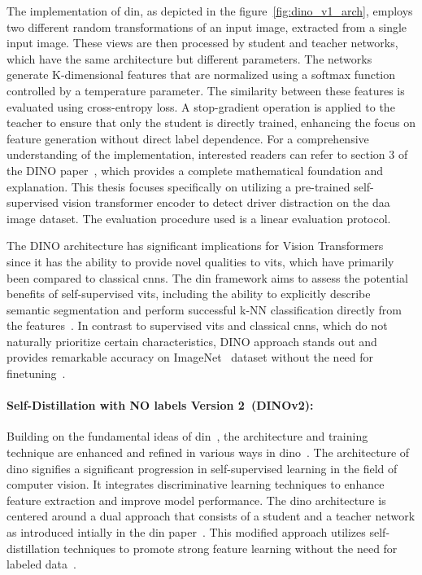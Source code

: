 The implementation of \gls{din}, as depicted in the figure~\ref{fig:dino_v1_arch}, employs two different random transformations of an input image, extracted from a single input image. These views are then processed by student and teacher networks, which have the same architecture but different parameters. The networks generate K-dimensional features that are normalized using a softmax function controlled by a temperature parameter. The similarity between these features is evaluated using cross-entropy loss. A stop-gradient operation is applied to the teacher to ensure that only the student is directly trained, enhancing the focus on feature generation without direct label dependence. For a comprehensive understanding of the implementation, interested readers can refer to section 3 of the DINO paper~\citep{dino_caron2021emerging}, which provides a complete mathematical foundation and explanation. This thesis focuses specifically on utilizing a pre-trained self-supervised vision transformer encoder to detect driver distraction on the \gls{daa} image dataset. The evaluation procedure used is a linear evaluation protocol.

The DINO architecture has significant implications for Vision Transformers~\citep{Vit_Paper_Dosovitskiy2020AnII} since it has the ability to provide novel qualities to \gls{vit}s, which have primarily been compared to classical \gls{cnn}s. The \gls{din} framework aims to assess the potential benefits of self-supervised \gls{vit}s, including the ability to explicitly describe semantic segmentation and perform successful k-NN classification directly from the features~\cite{dino_caron2021emerging}. In contrast to supervised \gls{vit}s and classical \gls{cnn}s, which do not naturally prioritize certain characteristics, DINO approach stands out and provides remarkable accuracy on ImageNet~\citep{Imagenet1k_ILSVRC15, Imagenet_21K_ridnik2021imagenet} dataset without the need for finetuning~\cite{dino_caron2021emerging}.

\paragraph{Self-Distillation with NO labels Version 2~(DINOv2):}
Building on the fundamental ideas of \gls{din}~\cite{dino_caron2021emerging}, the architecture and training technique are enhanced and refined in various ways in \gls{dino}~\cite{dinov2_oquab2023dinov2}. The architecture of \gls{dino} signifies a significant progression in self-supervised learning in the field of computer vision. It integrates discriminative learning techniques to enhance feature extraction and improve model performance. The \gls{dino} architecture is centered around a dual approach that consists of a student and a teacher network as introduced intially in the \gls{din} paper~\cite{dino_caron2021emerging}. This modified approach utilizes self-distillation techniques to promote strong feature learning without the need for labeled data~\cite{dinov2_oquab2023dinov2}.

